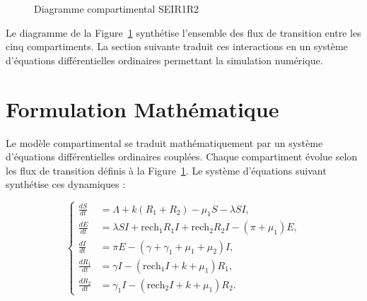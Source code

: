 \documentclass[11pt]{article}
\begin{document}
\begin{figure}[H]
{
} %
\caption{Diagramme compartimental SEIR1R2}
\label{fig:diagramme}
\end{figure}

Le diagramme de la Figure~\ref{fig:diagramme} synthétise l'ensemble des flux de transition entre les cinq compartiments. La section suivante traduit ces interactions en un système d'équations différentielles ordinaires permettant la simulation numérique.

\section{Formulation Mathématique}\label{sec:formulation}

Le modèle compartimental se traduit mathématiquement par un système d'équations différentielles ordinaires couplées. Chaque compartiment évolue selon les flux de transition définis à la Figure~\ref{fig:diagramme}. Le système d'équations suivant synthétise ces dynamiques :

\[
\left\{ \begin{aligned}
\frac{dS}{dt} &= \Lambda + k(R_1 + R_2) - \mu_1 S - \lambda S I, \\
\frac{dE}{dt} &= \lambda S I + \mathrm{rech}_1 R_1 I + \mathrm{rech}_2 R_2 I - (\pi + \mu_1) E, \\
\frac{dI}{dt} &= \pi E - (\gamma + \gamma_1 + \mu_1 + \mu_2) I, \\
\frac{dR_1}{dt} &= \gamma I - (\mathrm{rech}_1 I + k + \mu_1) R_1, \\
\frac{dR_2}{dt} &= \gamma_1 I - (\mathrm{rech}_2 I + k + \mu_1) R_2.
\end{aligned} \right.
\]
\end{document}
